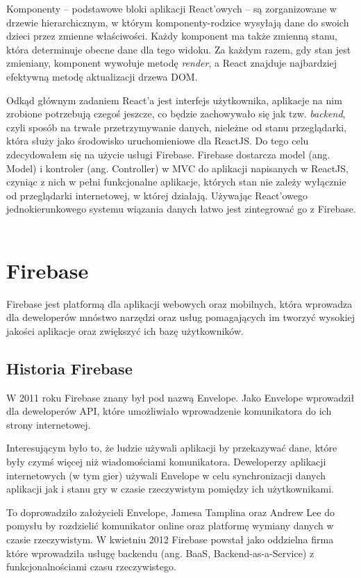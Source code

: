 Komponenty – podstawowe bloki aplikacji React'owych – są zorganizowane w drzewie hierarchicznym,
w którym komponenty-rodzice wysyłają dane do swoich dzieci przez zmienne właściwości.
Każdy komponent ma także zmienną stanu, która determinuje obecne dane dla tego widoku.
Za każdym razem, gdy stan jest zmieniany, komponent wywołuje metodę \textit{render},
a React znajduje najbardziej efektywną metodę aktualizacji drzewa DOM\@.

Odkąd głównym zadaniem React’a jest interfejs użytkownika,
aplikacje na nim zrobione potrzebują czegoś jeszcze,
co będzie zachowywało się jak tzw. \textit{backend}, czyli sposób na trwałe
przetrzymywanie danych, nieleżne od stanu przeglądarki, która służy jako
środowisko uruchomieniowe dla ReactJS\@.
Do tego celu zdecydowałem się na użycie usługi Firebase.
Firebase dostarcza model (ang. Model) i kontroler (ang. Controller) w MVC
do aplikacji napisanych w ReactJS, czyniąc z nich w pełni funkcjonalne aplikacje,
których stan nie zależy wyłącznie od przeglądarki internetowej, w której działają.
Używając React’owego jednokierunkowego systemu wiązania danych łatwo jest zintegrować go z Firebase.
~\cite{www_react}

\section{Firebase}

Firebase jest platformą dla aplikacji webowych oraz mobilnych, która wprowadza
dla deweloperów mnóstwo narzędzi oraz usług pomagających im tworzyć wysokiej jakości
aplikacje oraz zwiększyć ich bazę użytkowników.

\subsection{Historia Firebase}

W 2011 roku Firebase znany był pod nazwą Envelope.
Jako Envelope wprowadził dla deweloperów API,
które umożliwiało wprowadzenie komunikatora do ich strony internetowej.

Interesującym było to, że ludzie używali aplikacji by przekazywać dane,
które były czymś więcej niż wiadomościami komunikatora.
Deweloperzy aplikacji internetowych (w tym gier) używali Envelope
w celu synchronizacji danych aplikacji jak i stanu gry
w czasie rzeczywistym pomiędzy ich użytkownikami.

To doprowadziło założycieli Envelope, Jamesa Tamplina oraz Andrew Lee
do pomysłu by rozdzielić komunikator online oraz platformę wymiany danych w czasie rzeczywistym.
W kwietniu 2012 Firebase powstał jako oddzielna firma które wprowadziła usługę backendu
(ang. BaaS, Backend-as-a-Service) z funkcjonalnościami czasu rzeczywistego.

